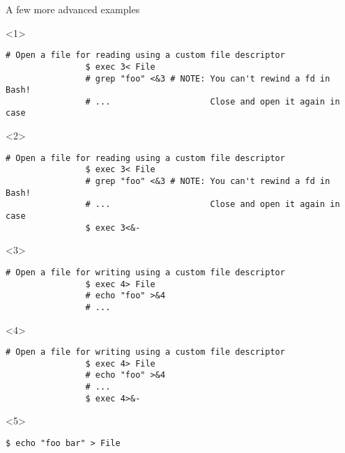 \begin{frame}[fragile]{A few more advanced examples}
    \vspace{-5mm}
    \begin{overlayarea}{\textwidth}{0.38\textheight}
        \begin{onlyenv}<1>
            \begin{lstlisting}[style=MyBash, numbers=none, xrightmargin=3mm]
                # Open a file for reading using a custom file descriptor
                $ exec 3< File
                # grep "foo" <&3 # NOTE: You can't rewind a fd in Bash!
                # ...                    Close and open it again in case
            \end{lstlisting}
        \end{onlyenv}
        \begin{onlyenv}<2>
            \begin{lstlisting}[style=MyBash, numbers=none, xrightmargin=3mm]
                # Open a file for reading using a custom file descriptor
                $ exec 3< File
                # grep "foo" <&3 # NOTE: You can't rewind a fd in Bash!
                # ...                    Close and open it again in case
                $ exec 3<&-
            \end{lstlisting}
        \end{onlyenv}
        \begin{onlyenv}<3>
            \begin{lstlisting}[style=MyBash, numbers=none, xrightmargin=3mm]
                # Open a file for writing using a custom file descriptor
                $ exec 4> File
                # echo "foo" >&4 
                # ...
            \end{lstlisting}
        \end{onlyenv}
        \begin{onlyenv}<4>
            \begin{lstlisting}[style=MyBash, numbers=none, xrightmargin=3mm]
                # Open a file for writing using a custom file descriptor
                $ exec 4> File
                # echo "foo" >&4 
                # ...
                $ exec 4>&-
            \end{lstlisting}
        \end{onlyenv}
        \begin{onlyenv}<5>
            \begin{lstlisting}[style=MyBash, numbers=none, xrightmargin=3mm]
                $ echo "foo bar" > File

\end{lstlisting}
\end{onlyenv}
\end{overlayarea}
\end{frame}
